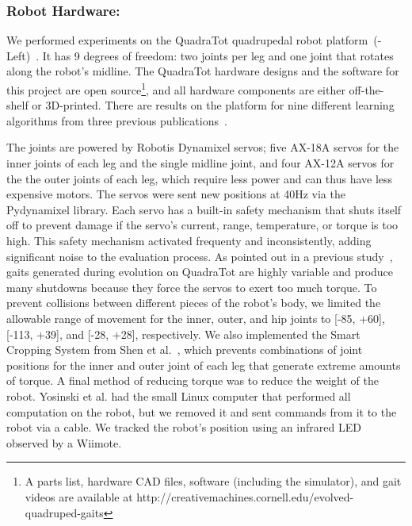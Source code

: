 \subsubsection{Robot Hardware:}

We performed experiments on the QuadraTot quadrupedal robot platform~(-Left)~\cite{yos:clune}.
It has 9 degrees of freedom: two joints per leg and one joint that rotates along the robot's midline. %
The QuadraTot hardware designs and the software for this project are open source\footnote{A parts list, hardware CAD files, software (including the simulator), and gait videos are available at http://creativemachines.cornell.edu/evolved-quadruped-gaits}, and all hardware components are either off-the-shelf or 3D-printed. %
There are results on the platform for nine different learning algorithms from three previous publications~\cite{yos:clune,glette,haocheng}. 


The joints are powered by Robotis Dynamixel servos; five AX-18A servos for the inner joints of each leg and the single midline joint, and four AX-12A servos for the the outer joints of each leg, which require less power and can thus have less expensive motors. The servos were sent new positions at 40Hz via the Pydynamixel library. Each servo has a built-in safety mechanism that shuts itself off to prevent damage if the servo's current, range, temperature, or torque is too high. This safety mechanism activated frequenty and inconsistently, adding significant noise to the evaluation process. As pointed out in a previous study~\cite{yos:clune}, gaits generated during evolution on QuadraTot are highly variable and produce many shutdowns because they force the servos to exert too much torque.
To prevent collisions between different pieces of the robot's body, we limited the allowable range of movement for the inner, outer, and hip joints to [-85\degree, +60\degree], [-113\degree, +39\degree], and [-28\degree, +28\degree], respectively. We also implemented the Smart Cropping System from Shen et al.~\cite{haocheng}, which prevents combinations of joint positions for the inner and outer joint of each leg that generate extreme amounts of torque. A final method of reducing torque was to reduce the weight of the robot. Yosinski et al. had the small Linux computer that performed all computation on the robot, but we removed it and sent commands from it to the robot via a cable. We tracked the robot's position using an infrared LED observed by a Wiimote.
